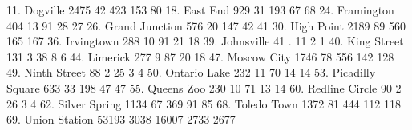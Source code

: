         11. Dogville {\VBAR}       2475          42         423         153          80
        18. East End {\VBAR}        929          31         193          67          68
      24. Framington {\VBAR}        404          13          91          28          27
  26. Grand Junction {\VBAR}        576          20         147          42          41
      30. High Point {\VBAR}       2189          89         560         165         167
      36. Irvingtown {\VBAR}        288          10          91          21          18
      39. Johnsville {\VBAR}         41           .          11           2           1
     40. King Street {\VBAR}        131           3          38           8           6
        44. Limerick {\VBAR}        277           9          87          20          18
     47. Moscow City {\VBAR}       1746          78         556         142         128
    49. Ninth Street {\VBAR}         88           2          25           3           4
    50. Ontario Lake {\VBAR}        232          11          70          14          14
53. Picadilly Square {\VBAR}        633          33         198          47          47
      55. Queens Zoo {\VBAR}        230          10          71          13          14
  60. Redline Circle {\VBAR}         90           2          26           3           4
   62. Silver Spring {\VBAR}       1134          67         369          91          85
     68. Toledo Town {\VBAR}       1372          81         444         112         118
   69. Union Station {\VBAR}      53193        3038       16007        2733        2677
